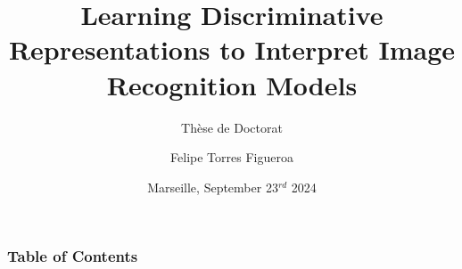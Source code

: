 \documentclass[xcolor=dvipsnames]{beamer}
\title[] %
{Learning Discriminative Representations to Interpret Image Recognition Models}
\subtitle{Thèse de Doctorat}
\author[Felipe Torres Figueroa] %
{Felipe Torres Figueroa}
\institute[ECM] %
{
  \'Ecole Centrale de Marseille
  \and
  Laboratoire d'Informatique et de Syst\`emes (LIS)
}
\date[2024] %
{Marseille, September 23$^{rd}$ 2024}
\begin{document}
	{
	\begin{frame}
		\maketitle
	\end{frame}
	}
	\logo{}
	\begin{frame}
		\frametitle{Table of Contents}
		\tableofcontents
	\end{frame}
	
	
	
	
	
	
\end{document}
